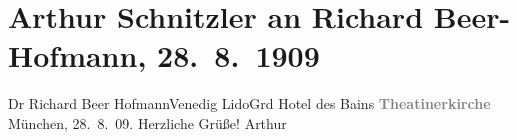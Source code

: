 

         
         \renewcommand{\erwaehntePersonen}{Personen: Richard Beer-Hofmann}
         \renewcommand{\erwaehnteOrte}{Orte: Grand Hotel des Bains, Lido, München, Santa Maria Elisabetta, Theatinerkirche}
         \renewcommand{\erwaehnteWerke}{Werke: Theatinerkirche}
               \section[Arthur Schnitzler an Richard Beer-Hofmann, 28. 8. 1909]{ Arthur Schnitzler an Richard Beer-Hofmann, 28. 8. 1909}\nopagebreak{}\rehead{ }\begin{ledgroupsized}[t]{13cm}\normalsize\beginnumbering \toendnotes[C]{\smallbreak\pagebreak[2]} 
\pstart{}{\pb}Dr Richard Beer Hofmann\pend{}\pstart{}Venedig Lido\pend{}\pstart{}Grd Hotel des Bains\pend{}{\bigskip}\pstart
           \noindent{}\centering{}{\pb}\textcolor{gray}{\textbf{Theatinerkirche}}\pend
           \pstart
           \centering{}{\pb}München, 28. 8. 09.\pend
           \pstart
           Herzliche Grüße!\pend
           \pstart \spacefill\mbox{Arthur}\pend{}
         
         \endnumbering{}\end{ledgroupsized}  \newcommand{\dateiname}{L01870}\newcommand{\titel}{Arthur Schnitzler an Richard Beer-Hofmann, 28. 8. 1909}\newcommand{\editorInnen}{Martin Anton Müller und Gerd-Hermann Susen}
      